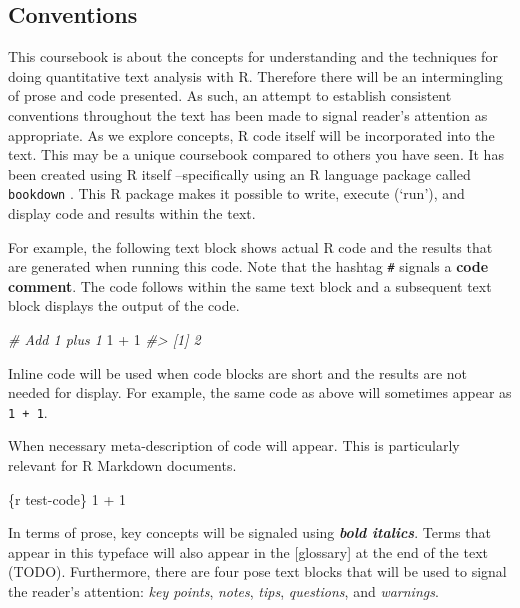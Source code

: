 \documentclass[
]{article}
\newenvironment{Shaded}{\begin{snugshade}}{\end{snugshade}}
\newcommand{\CommentTok}[1]{\textcolor[rgb]{0.56,0.35,0.01}{\textit{#1}}}
\newcommand{\DecValTok}[1]{\textcolor[rgb]{0.00,0.00,0.81}{#1}}
\newcommand{\NormalTok}[1]{#1}
\newcommand{\SpecialCharTok}[1]{\textcolor[rgb]{0.00,0.00,0.00}{#1}}
\begin{document}
\hypertarget{conventions}{%
\subsection*{Conventions}\label{conventions}}

This coursebook is about the concepts for understanding and the techniques for doing quantitative text analysis with R. Therefore there will be an intermingling of prose and code presented. As such, an attempt to establish consistent conventions throughout the text has been made to signal reader's attention as appropriate. As we explore concepts, R code itself will be incorporated into the text. This may be a unique coursebook compared to others you have seen. It has been created using R itself --specifically using an R language package called \texttt{bookdown} \citep{R-bookdown}. This R package makes it possible to write, execute (`run'), and display code and results within the text.

For example, the following text block shows actual R code and the results that are generated when running this code. Note that the hashtag \texttt{\#} signals a \textbf{code comment}. The code follows within the same text block and a subsequent text block displays the output of the code.

\begin{Shaded}
\begin{Highlighting}[]
\CommentTok{\# Add 1 plus 1}
\DecValTok{1} \SpecialCharTok{+} \DecValTok{1}
\CommentTok{\#\textgreater{} [1] 2}
\end{Highlighting}
\end{Shaded}

Inline code will be used when code blocks are short and the results are not needed for display. For example, the same code as above will sometimes appear as \texttt{1\ +\ 1}.

When necessary meta-description of code will appear. This is particularly relevant for R Markdown documents.

\begin{Shaded}
\begin{Highlighting}[]
\NormalTok{\textasciigrave{}\textasciigrave{}\textasciigrave{}\{r test{-}code\}}
\NormalTok{1 + 1}
\NormalTok{\textasciigrave{}\textasciigrave{}\textasciigrave{}}
\end{Highlighting}
\end{Shaded}

In terms of prose, key concepts will be signaled using \textbf{\emph{bold italics}}. Terms that appear in this typeface will also appear in the {[}glossary{]} at the end of the text (TODO). Furthermore, there are four pose text blocks that will be used to signal the reader's attention: \emph{key points}, \emph{notes}, \emph{tips}, \emph{questions}, and \emph{warnings}.
\end{document}
